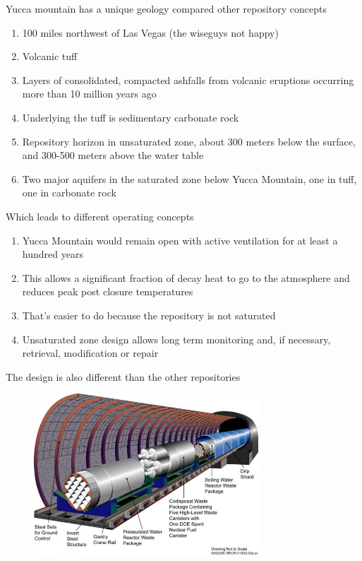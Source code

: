\documentclass[aspectratio=1610,pdftex,dvipsnames,compress,xcolor={dvipsnames}]{beamer}
\begin{document}
\begin{frame}{Yucca mountain has a unique geology compared other repository concepts}
    \begin{enumerate}[series=outerlist,topsep=0pt,itemsep=18pt,leftmargin=*,label=(\arabic*)]
        \item[]100 miles northwest of Las Vegas (the wiseguys not happy)
        \item[]Volcanic tuff
        \item[]Layers of consolidated, compacted ashfalls from volcanic eruptions occurring more than 10 million years ago 
        \item[]Underlying the tuff is sedimentary carbonate rock
        \item[]Repository horizon in unsaturated zone, about 300 meters below the surface, and 300-500 meters above the water table
        \item[]Two major aquifers in the saturated zone below Yucca Mountain, one in tuff, one in carbonate rock
    \end{enumerate}
\end{frame}


\begin{frame}{Which leads to different operating concepts}
    \begin{enumerate}[series=outerlist,topsep=0pt,itemsep=18pt,leftmargin=*,label=(\arabic*)]
        \item[]Yucca Mountain would remain open with active ventilation for at least a hundred years
        \item[]This allows a significant fraction of decay heat to go to the atmosphere and reduces peak post closure temperatures
        \item[]That's easier to do because the repository is not saturated
        \item[]Unsaturated zone design allows long term monitoring and, if necessary, retrieval, modification or repair
    \end{enumerate}
\end{frame}


\begin{frame}{The design is also different than the other repositories}
    \begin{figure}
        \centering
        \includegraphics[width=0.75\textwidth]{yucca.waste.jpg}
    \end{figure}
\end{frame}
\end{document}
